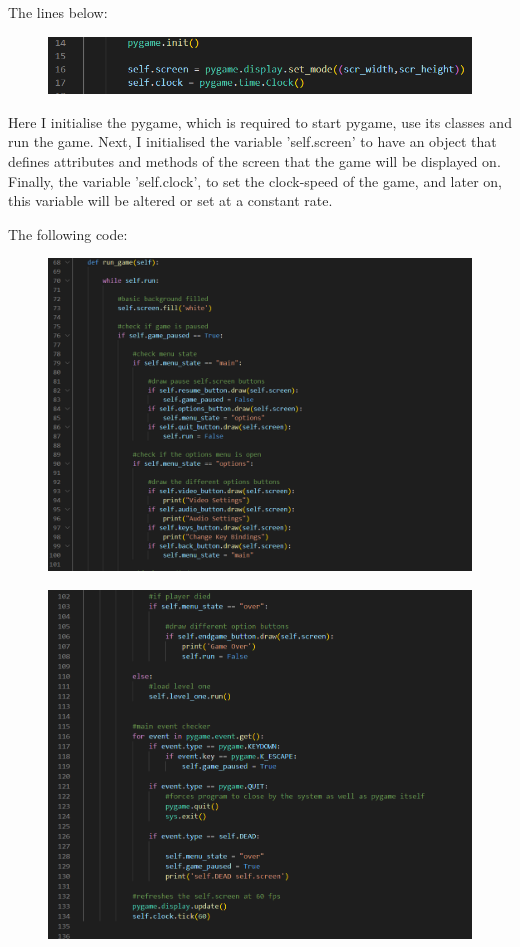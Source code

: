\documentclass[12pt]{article}
\begin{document}
The lines below:\\
\begin{figure}[H]
    \includegraphics[width = 12cm]{game class/intitialisePyGame.PNG}
    \centering
\end{figure}
\vspace{3em}

Here I initialise the pygame, which is required to start pygame, use its classes and run the game. Next, I initialised the variable 'self.screen' to have an object that defines attributes and methods of the screen that the game will be displayed on. Finally, the variable 'self.clock', to set the clock-speed of the game, and later on, this variable will be altered or set at a constant rate.

The following code:\\
\begin{figure}[H]
    \includegraphics[width = 18cm]{game class/run1.PNG}
    \centering
\end{figure}
\begin{figure}[H]
    \includegraphics[width = 18cm]{game class/run2.PNG}
    \centering
\end{figure}
\end{document}
